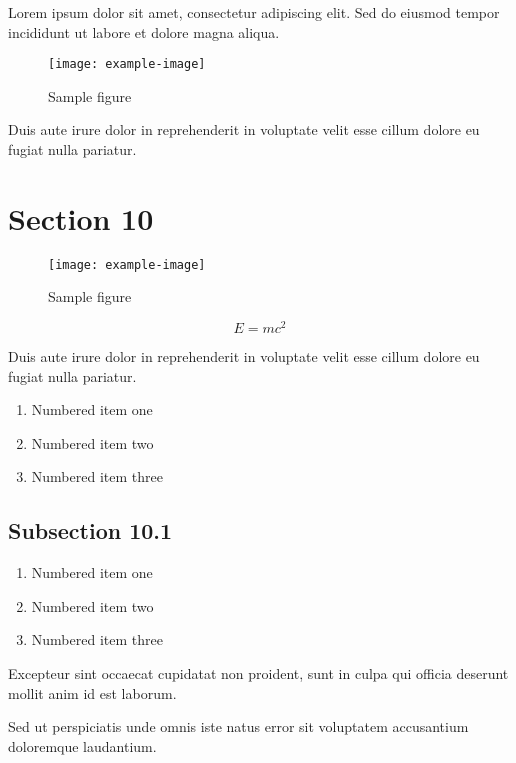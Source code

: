 \documentclass{article}
\begin{document}
Lorem ipsum dolor sit amet, consectetur adipiscing elit. Sed do eiusmod tempor incididunt ut labore et dolore magna aliqua.

\begin{figure}[h]
    \centering
    \texttt{[image: example-image]}
    \caption{Sample figure}
    \label{fig:sample}
\end{figure}

Duis aute irure dolor in reprehenderit in voluptate velit esse cillum dolore eu fugiat nulla pariatur.

\section{Section 10}


\begin{figure}[h]
    \centering
    \texttt{[image: example-image]}
    \caption{Sample figure}
    \label{fig:sample}
\end{figure}

\begin{equation}
    E = mc^2
\end{equation}

Duis aute irure dolor in reprehenderit in voluptate velit esse cillum dolore eu fugiat nulla pariatur.

\begin{enumerate}
\item Numbered item one
\item Numbered item two
\item Numbered item three
\end{enumerate}

\subsection{Subsection 10.1}


\begin{enumerate}
\item Numbered item one
\item Numbered item two
\item Numbered item three
\end{enumerate}

Excepteur sint occaecat cupidatat non proident, sunt in culpa qui officia deserunt mollit anim id est laborum.

Sed ut perspiciatis unde omnis iste natus error sit voluptatem accusantium doloremque laudantium.
\end{document}

